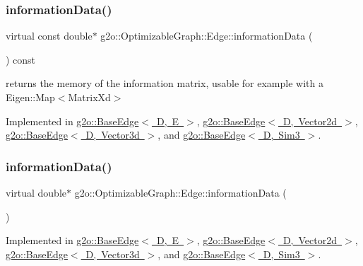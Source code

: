 \subsubsection{\texorpdfstring{information\+Data()}{informationData()}\hspace{0.1cm}{\footnotesize\ttfamily [1/2]}}
{\footnotesize\ttfamily virtual const double$\ast$ g2o\+::\+Optimizable\+Graph\+::\+Edge\+::information\+Data (\begin{DoxyParamCaption}{ }\end{DoxyParamCaption}) const\hspace{0.3cm}{\ttfamily [pure virtual]}}



returns the memory of the information matrix, usable for example with a Eigen\+::\+Map$<$\+Matrix\+Xd$>$ 



Implemented in \mbox{\hyperlink{classg2o_1_1_base_edge_acf02f0d69998b75b207bc102f079d5b8}{g2o\+::\+Base\+Edge$<$ D, E $>$}}, \mbox{\hyperlink{classg2o_1_1_base_edge_acf02f0d69998b75b207bc102f079d5b8}{g2o\+::\+Base\+Edge$<$ D, Vector2d $>$}}, \mbox{\hyperlink{classg2o_1_1_base_edge_acf02f0d69998b75b207bc102f079d5b8}{g2o\+::\+Base\+Edge$<$ D, Vector3d $>$}}, and \mbox{\hyperlink{classg2o_1_1_base_edge_acf02f0d69998b75b207bc102f079d5b8}{g2o\+::\+Base\+Edge$<$ D, Sim3 $>$}}.

\mbox{\label{classg2o_1_1_optimizable_graph_1_1_edge_a99de4bbb57e3c5e7321f150a45d1cb12}} 
\subsubsection{\texorpdfstring{information\+Data()}{informationData()}\hspace{0.1cm}{\footnotesize\ttfamily [2/2]}}
{\footnotesize\ttfamily virtual double$\ast$ g2o\+::\+Optimizable\+Graph\+::\+Edge\+::information\+Data (\begin{DoxyParamCaption}{ }\end{DoxyParamCaption})\hspace{0.3cm}{\ttfamily [pure virtual]}}



Implemented in \mbox{\hyperlink{classg2o_1_1_base_edge_a72ae9d215d6abc892f735e3d3ab81a88}{g2o\+::\+Base\+Edge$<$ D, E $>$}}, \mbox{\hyperlink{classg2o_1_1_base_edge_a72ae9d215d6abc892f735e3d3ab81a88}{g2o\+::\+Base\+Edge$<$ D, Vector2d $>$}}, \mbox{\hyperlink{classg2o_1_1_base_edge_a72ae9d215d6abc892f735e3d3ab81a88}{g2o\+::\+Base\+Edge$<$ D, Vector3d $>$}}, and \mbox{\hyperlink{classg2o_1_1_base_edge_a72ae9d215d6abc892f735e3d3ab81a88}{g2o\+::\+Base\+Edge$<$ D, Sim3 $>$}}.

